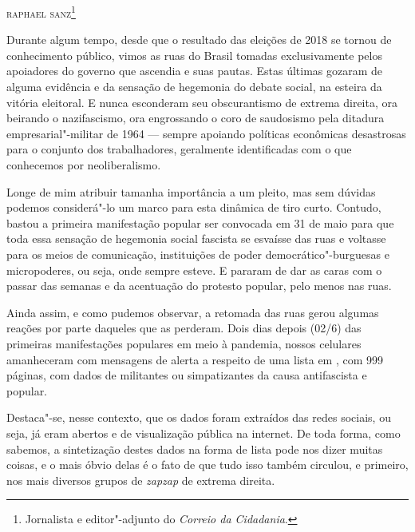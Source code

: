 \hfill{}\textsc{raphael sanz}\footnote{Jornalista e editor"-adjunto do \emph{Correio da Cidadania}.}

\bigskip


Durante algum tempo, desde que o resultado das eleições de 2018 se
tornou de conhecimento público, vimos as ruas do Brasil tomadas
exclusivamente pelos apoiadores do governo que ascendia e suas pautas.
Estas últimas gozaram de alguma evidência e da sensação de hegemonia do
debate social, na esteira da vitória eleitoral. E nunca esconderam seu
obscurantismo de extrema direita, ora beirando o nazifascismo, ora
engrossando o coro de saudosismo pela ditadura empresarial"-militar de 1964
--- sempre apoiando políticas econômicas desastrosas para o conjunto dos
trabalhadores, geralmente identificadas com o que conhecemos por
neoliberalismo.

Longe de mim atribuir tamanha importância a um pleito, mas sem dúvidas
podemos considerá"-lo um marco para esta dinâmica de tiro curto. Contudo,
bastou a primeira manifestação popular ser convocada em 31 de maio para
que toda essa sensação de hegemonia social fascista se esvaísse das ruas
e voltasse para os meios de comunicação, instituições de poder
democrático"-burguesas e micropoderes, ou seja, onde sempre esteve. E
pararam de dar as caras com o passar das semanas e da acentuação do
protesto popular, pelo menos nas ruas.

Ainda assim, e como pudemos observar, a retomada das ruas gerou algumas
reações por parte daqueles que as perderam. Dois dias depois (02/6) das
primeiras manifestações populares em meio à pandemia, nossos celulares
amanheceram com mensagens de alerta a respeito de uma lista em , com
999 páginas, com dados de militantes ou simpatizantes da causa
antifascista e popular.

Destaca"-se, nesse contexto, que os dados foram extraídos das redes
sociais, ou seja, já eram abertos e de visualização pública na internet.
De toda forma, como sabemos, a sintetização destes dados na forma de
lista pode nos dizer muitas coisas, e o mais óbvio delas é o fato de que
tudo isso também circulou, e primeiro, nos mais diversos grupos de
\emph{zapzap} de extrema direita.

